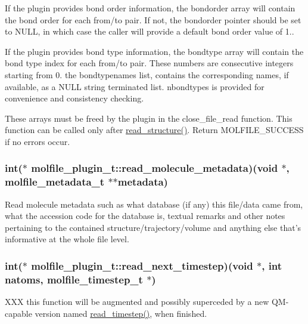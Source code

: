 \-If the plugin provides bond order information, the bondorder array will contain the bond order for each from/to pair. \-If not, the bondorder pointer should be set to \-N\-U\-L\-L, in which case the caller will provide a default bond order value of 1..

\-If the plugin provides bond type information, the bondtype array will contain the bond type index for each from/to pair. \-These numbers are consecutive integers starting from 0. the bondtypenames list, contains the corresponding names, if available, as a \-N\-U\-L\-L string terminated list. nbondtypes is provided for convenience and consistency checking.

\-These arrays must be freed by the plugin in the close\-\_\-file\-\_\-read function. \-This function can be called only after \hyperlink{structmolfile__plugin__t_af05a7c088226fc0ecc3fe3feca347754}{read\-\_\-structure()}. \-Return \-M\-O\-L\-F\-I\-L\-E\-\_\-\-S\-U\-C\-C\-E\-S\-S if no errors occur. \hypertarget{structmolfile__plugin__t_ae34996861c7be39038802b1c4d52591d}{
\subsubsection[{read\-\_\-molecule\-\_\-metadata}]{\setlength{\rightskip}{0pt plus 5cm}int($\ast$  {\bf molfile\-\_\-plugin\-\_\-t\-::read\-\_\-molecule\-\_\-metadata})({\bf void} $\ast$, {\bf molfile\-\_\-metadata\-\_\-t} $\ast$$\ast$metadata)}}\label{structmolfile__plugin__t_ae34996861c7be39038802b1c4d52591d}
\-Read molecule metadata such as what database (if any) this file/data came from, what the accession code for the database is, textual remarks and other notes pertaining to the contained structure/trajectory/volume and anything else that's informative at the whole file level. \hypertarget{structmolfile__plugin__t_a236f89950634743ee58330622407f255}{
\subsubsection[{read\-\_\-next\-\_\-timestep}]{\setlength{\rightskip}{0pt plus 5cm}int($\ast$  {\bf molfile\-\_\-plugin\-\_\-t\-::read\-\_\-next\-\_\-timestep})({\bf void} $\ast$, int natoms, {\bf molfile\-\_\-timestep\-\_\-t} $\ast$)}}\label{structmolfile__plugin__t_a236f89950634743ee58330622407f255}
\-X\-X\-X this function will be augmented and possibly superceded by a new \-Q\-M-\/capable version named \hyperlink{structmolfile__plugin__t_a72589b78044886d6e2402c73fa2a72e9}{read\-\_\-timestep()}, when finished.

